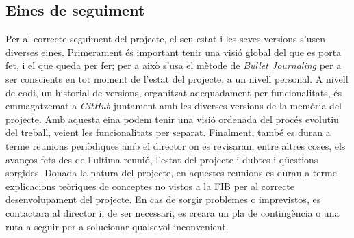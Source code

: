 \documentclass[a4paper]{report}
\begin{document}
	\subsection{Eines de seguiment}
	Per al correcte seguiment del projecte, el seu estat i les seves versions s'usen diverses eines. Primerament és important tenir una visió global del que es porta fet, i el que queda per fer; per a això s'usa el mètode de \textit{Bullet Journaling} per a ser conscients en tot moment de l'estat del projecte, a un nivell personal. \newline
	A nivell de codi, un historial de versions, organitzat adequadament per funcionalitats, és emmagatzemat a \textit{GitHub} juntament amb les diverses versions de la memòria del projecte. Amb aquesta eina podem tenir una visió ordenada del procés evolutiu del treball, veient les funcionalitats per separat.\newline
	Finalment, també es duran a terme reunions periòdiques amb el director on es revisaran, entre altres coses, els avanços fets des de l'ultima reunió, l'estat del projecte i dubtes i qüestions sorgides. Donada la natura del projecte, en aquestes reunions es duran a terme explicacions teòriques de conceptes no vistos a la FIB per al correcte desenvolupament del projecte.
	\newline
	En cas de sorgir problemes o imprevistos, es contactara al director i, de ser necessari, es creara un pla de contingència o una ruta a seguir per a solucionar qualsevol inconvenient. 
	 
	
	
	
	\newpage
	
	\renewcommand{\bibname}{Referencies}
	
	 
	
	
\end{document}
